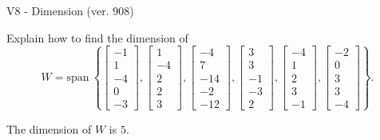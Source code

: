 \begin{exercise}
  \begin{exerciseTitle}V8 - Dimension (ver. 908)\end{exerciseTitle}
  \begin{exerciseStatement}
    Explain how to find the dimension of 
\[W=\mathrm{span}\ \left\{\left[\begin{array}{r}
-1 \\
1 \\
-4 \\
0 \\
-3
\end{array}\right] , \left[\begin{array}{r}
1 \\
-4 \\
2 \\
2 \\
3
\end{array}\right] , \left[\begin{array}{r}
-4 \\
7 \\
-14 \\
-2 \\
-12
\end{array}\right] , \left[\begin{array}{r}
3 \\
3 \\
-1 \\
-3 \\
2
\end{array}\right] , \left[\begin{array}{r}
-4 \\
1 \\
2 \\
3 \\
-1
\end{array}\right] , \left[\begin{array}{r}
-2 \\
0 \\
3 \\
3 \\
-4
\end{array}\right]\right\}.\]



  \end{exerciseStatement}
  \begin{exerciseAnswer}
   The dimension of \(W\) is  \(5\).
  


  \end{exerciseAnswer}
\end{exercise}